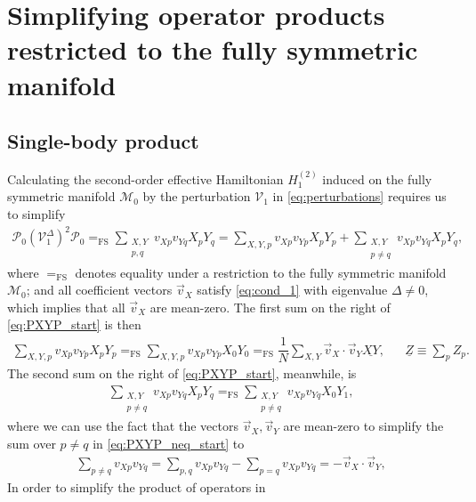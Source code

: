 \documentclass[nofootinbib,notitlepage,11pt]{revtex4-2}
\newcommand{\f}[2]{\dfrac{#1}{#2}} %
\newcommand{\p}[1]{\left(#1\right)} %
\renewcommand{\c}{\cdot} %
\renewcommand{\v}{\vec} %
\newcommand{\1}{\mathds{1}}
\newcommand{\M}{\mathcal{M}}
\renewcommand{\P}{\mathcal{P}}
\newcommand{\V}{\mathcal{V}}
\newcommand{\EQFS}{=_{\text{FS}}}
\newcommand{\col}{\underline}
\begin{document}
\section{Simplifying operator products restricted to the fully
  symmetric manifold}
\label{sec:sym_prod}

\subsection{Single-body product}
\label{sec:PXYP}

Calculating the second-order effective Hamiltonian $H_1^{(2)}$ induced
on the fully symmetric manifold $\M_0$ by the perturbation $\V_1$ in
\eqref{eq:perturbations} requires us to simplify
\begin{align}
  \P_0 \p{\V_1^\Delta}^2 \P_0
  \EQFS \sum_{\substack{X,Y\\p,q}} v_{Xp} v_{Yq} X_p Y_q
  = \sum_{X,Y,p} v_{Xp} v_{Yp} X_p Y_p
  + \sum_{\substack{X,Y\\p\ne q}} v_{Xp} v_{Yq} X_p Y_q,
  \label{eq:PXYP_start}
\end{align}
where $\EQFS$ denotes equality under a restriction to the fully
symmetric manifold $\M_0$; and all coefficient vectors $\v v_X$
satisfy \eqref{eq:cond_1} with eigenvalue $\Delta\ne0$, which implies
that all $\v v_X$ are mean-zero.  The first sum on the right of
\eqref{eq:PXYP_start} is then
\begin{align}
  \sum_{X,Y,p} v_{Xp} v_{Yp} X_p Y_p
  \EQFS \sum_{X,Y,p} v_{Xp} v_{Yp} X_0 Y_0
  \EQFS \f1N \sum_{X,Y} \v v_X \c\v v_Y \col{XY},
  &&
  \col{Z} \equiv \sum_p Z_p.
  \label{eq:PXYP_eq}
\end{align}
The second sum on the right of \eqref{eq:PXYP_start}, meanwhile, is
\begin{align}
  \sum_{\substack{X,Y\\p\ne q}} v_{Xp} v_{Yq} X_p Y_q
  \EQFS \sum_{\substack{X,Y\\p\ne q}} v_{Xp} v_{Yq} X_0 Y_1,
  \label{eq:PXYP_neq_start}
\end{align}
where we can use the fact that the vectors $\v v_X,\v v_Y$ are
mean-zero to simplify the sum over $p\ne q$ in
\eqref{eq:PXYP_neq_start} to
\begin{align}
  \sum_{p\ne q} v_{Xp} v_{Yq}
  = \sum_{p,q} v_{Xp} v_{Yq} - \sum_{p=q} v_{Xp} v_{Yq}
  = - \v v_X\c\v v_Y,
\end{align}
In order to simplify the product of operators in
\end{document}
